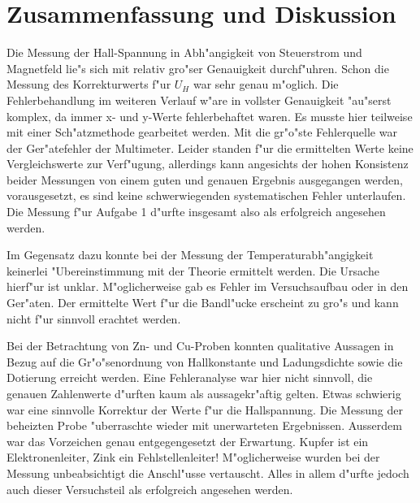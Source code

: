 \documentclass[a4paper,10pt]{article}
\begin{document}
\section{Zusammenfassung und Diskussion}
Die Messung der Hall-Spannung in Abh"angigkeit von Steuerstrom und Magnetfeld lie"s sich mit relativ gro"ser Genauigkeit durchf"uhren. Schon die Messung des Korrekturwerts f"ur $U_H$ war sehr genau m"oglich. Die Fehlerbehandlung im weiteren Verlauf w"are in vollster Genauigkeit "au"serst komplex, da immer x- und y-Werte fehlerbehaftet waren. Es musste hier teilweise mit einer Sch"atzmethode gearbeitet werden. Mit die gr"o"ste Fehlerquelle war der Ger"atefehler der Multimeter. Leider standen f"ur die ermittelten Werte keine Vergleichswerte zur Verf"ugung, allerdings kann angesichts der hohen Konsistenz beider Messungen von einem guten und genauen Ergebnis ausgegangen werden, vorausgesetzt, es sind keine schwerwiegenden systematischen Fehler unterlaufen. Die Messung f"ur Aufgabe 1 d"urfte insgesamt also als erfolgreich angesehen werden.

Im Gegensatz dazu konnte bei der Messung der Temperaturabh"angigkeit keinerlei "Ubereinstimmung mit der Theorie ermittelt werden. Die Ursache hierf"ur ist unklar. M"oglicherweise gab es Fehler im Versuchsaufbau oder in den Ger"aten. Der ermittelte Wert f"ur die Bandl"ucke erscheint zu gro"s und kann nicht f"ur sinnvoll erachtet werden.

Bei der Betrachtung von Zn- und Cu-Proben konnten qualitative Aussagen in Bezug auf die Gr"o"senordnung von Hallkonstante und Ladungsdichte sowie die Dotierung erreicht werden. Eine Fehleranalyse war hier nicht sinnvoll, die genauen Zahlenwerte d"urften kaum als aussagekr"aftig gelten. Etwas schwierig war eine sinnvolle Korrektur der Werte f"ur die Hallspannung. Die Messung der beheizten Probe "uberraschte wieder mit unerwarteten Ergebnissen. Ausserdem war das Vorzeichen genau entgegengesetzt der Erwartung. Kupfer ist ein Elektronenleiter, Zink ein Fehlstellenleiter! M"oglicherweise wurden bei der Messung unbeabsichtigt die Anschl"usse vertauscht. Alles in allem d"urfte jedoch auch dieser Versuchsteil als erfolgreich angesehen werden.
\end{document}

